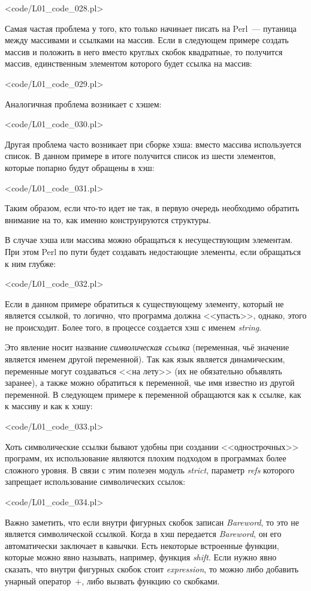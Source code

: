 \pr<code/L01_code_028.pl>

Самая частая проблема у того, кто только начинает писать на Perl~--- путаница между массивами и ссылками на массив.
Если в следующем примере создать массив и положить в него вместо круглых скобок квадратные, то получится массив, единственным элементом которого будет ссылка на массив:

\pr<code/L01_code_029.pl>

Аналогичная проблема возникает с хэшем:

\pr<code/L01_code_030.pl>

Другая проблема часто возникает при сборке хэша: вместо массива используется список.
В данном примере в итоге получится список из шести элементов, которые попарно будут обращены в хэш:

\pr<code/L01_code_031.pl>

Таким образом, если что-то идет не так, в первую очередь необходимо обратить внимание на то, как именно конструируются структуры.

В случае хэша или массива можно обращаться к несуществующим элементам.
При этом Perl по пути будет создавать недостающие элементы, если обращаться к ним глубже:

\pr<code/L01_code_032.pl>

Если в данном примере обратиться к существующему элементу, который не является ссылкой, то логично, что программа должна <<упасть>>, однако, этого не происходит.
Более того, в процессе создается хэш с именем \textit{string}.

Это явление носит название \textit{символическая ссылка} (переменная, чьё значение является именем другой переменной).
Так как язык является динамическим, переменные могут создаваться <<на лету>> (их не обязательно объявлять заранее), а также можно обратиться к переменной, чье имя известно из другой переменной.
В следующем примере к переменной обращаются как к ссылке, как к массиву и как к хэшу:

\pr<code/L01_code_033.pl>

Хоть символические ссылки бывают удобны при создании <<однострочных>> программ, их использование являются плохим подходом в программах более сложного уровня.
В связи с этим полезен модуль \textit{strict}, параметр \textit{refs} которого запрещает использование символических ссылок:

\pr<code/L01_code_034.pl>

Важно заметить, что если внутри фигурных скобок записан \textit{Bareword}, то это не является символической ссылкой.
Когда в хэш передается \textit{Bareword}, он его автоматически заключает в кавычки.
Есть некоторые встроенные функции, которые можно явно называть, например, функция \textit{shift}.
Если нужно явно сказать, что внутри фигурных скобок стоит \textit{expression}, то можно либо добавить унарный оператор~$+$, либо вызвать функцию со скобками.

